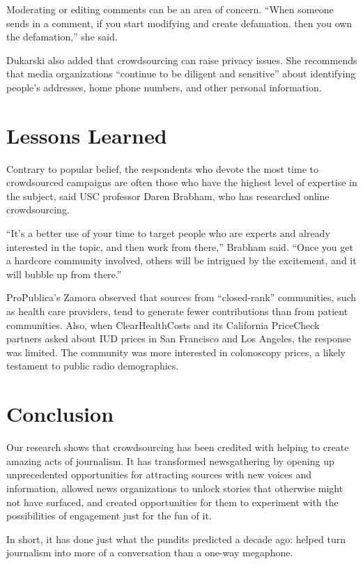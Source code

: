 \begin{itemize}
\begin{itemize}
\begin{enumerate}
{Moderating or editing comments can be an area of concern. “When someone sends in a comment, if you start modifying and create defamation, then you own the defamation,” she said.

Dukarski also added that crowdsourcing can raise privacy issues. She recommends that media organizations “continue to be diligent and sensitive” about identifying people’s addresses, home phone numbers, and other personal information. 


\chapter{Lessons Learned} 

Contrary to popular belief, the respondents who devote the most time to crowdsourced campaigns are often those who have the highest level of expertise in the subject, said USC professor Daren Brabham, who has researched online crowdsourcing. 

“It’s a better use of your time to target people who are experts and already interested in the topic, and then work from there,” Brabham said. “Once you get a hardcore community involved, others will be intrigued by the excitement, and it will bubble up from there.”\autocite{BrabhamAmateur}

ProPublica’s Zamora observed that sources from “closed-rank” communities, such as health care providers, tend to generate fewer contributions than from patient communities. Also, when ClearHealthCosts and its California PriceCheck partners asked about IUD prices in San Francisco and Los Angeles, the response was limited. The community was more interested in colonoscopy prices, a likely testament to public radio demographics.\autocite{Aliferis}

\chapter{Conclusion} 

Our research shows that crowdsourcing has been credited with helping to create amazing acts of journalism. It has transformed newsgathering by opening up unprecedented opportunities for attracting sources with new voices and information, allowed news organizations to unlock stories that otherwise might not have surfaced, and created opportunities for them to experiment with the possibilities of engagement just for the fun of it.

In short, it has done just what the pundits predicted a decade ago: helped turn journalism into more of a conversation than a one-way megaphone. 

}
\end{enumerate}
\end{itemize}
\end{itemize}
